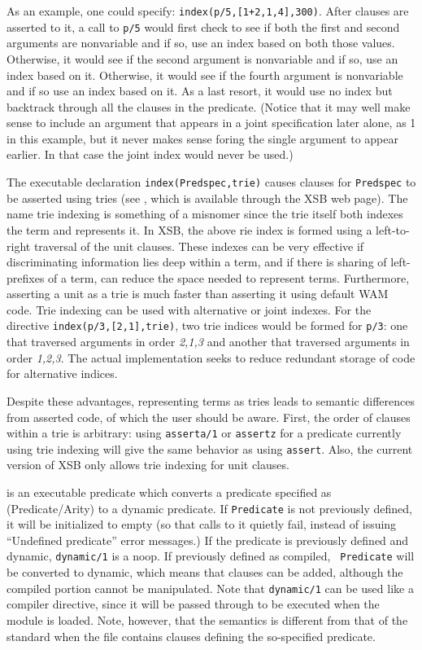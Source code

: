 \begin{description}
As an example, one could specify: {\tt index(p/5,[1+2,1,4],300)}.
After clauses are asserted to it, a call to {\tt p/5} would first
check to see if both the first and second arguments are nonvariable
and if so, use an index based on both those values. Otherwise, it
would see if the second argument is nonvariable and if so, use an
index based on it. Otherwise, it would see if the fourth argument is
nonvariable and if so use an index based on it. As a last resort, it would
use no index but backtrack through all the clauses in the predicate.
(Notice that it may well make sense to include an argument that 
appears in a joint specification later alone, as 1 in this example,
but it never makes sense foring the single argument to appear earlier. In
that case the joint index would never be used.)

The executable declaration {\tt index(Predspec,trie)} causes clauses
for {\tt Predspec} to be asserted using tries (see \cite{RRSSW98},
which is available through the XSB web page).  The name trie indexing
is something of a misnomer since the trie itself both indexes the term
and represents it.  In XSB, the above rie index is formed using a
left-to-right traversal of the unit clauses.  These indexes can be
very effective if discriminating information lies deep within a term,
and if there is sharing of left-prefixes of a term, can reduce the
space needed to represent terms.  Furthermore, asserting a unit as a
trie is much faster than asserting it using default WAM code.  Trie
indexing can be used with alternative or joint indexes.  For the
directive {\tt index(p/3,[2,1],trie)}, two trie indices would be
formed for {\tt p/3}: one that traversed arguments in order {\em
2,1,3} and another that traversed arguments in order {\em 1,2,3}.  The
actual implementation seeks to reduce redundant storage of code for
alternative indices.

Despite these advantages, representing terms as tries leads to
semantic differences from asserted code, of which the user should be
aware.  First, the order of clauses within a trie is arbitrary: using
{\tt asserta/1} or {\tt assertz} for a predicate currently using trie
indexing will give the same behavior as using {\tt assert}.  Also, the
current version of XSB only allows trie indexing for unit clauses.

\label{dynamic/1}
is an executable predicate which converts a predicate specified as
(Predicate/Arity) to a dynamic predicate. If {\tt Predicate} is not
previously defined, it will be initialized to empty (so that calls to
it quietly fail, instead of issuing {\sf ``Undefined predicate''}
error messages.) If the predicate is previously defined and dynamic,
{\tt dynamic/1} is a noop. If previously defined as compiled, {\tt
Predicate} will be converted to dynamic, which means that clauses can
be added, although the compiled portion cannot be manipulated.  Note
that {\tt dynamic/1} can be used like a compiler directive, since it
will be passed through to be executed when the module is loaded. Note,
however, that the semantics is different from that of the standard
\cite{ISO-Prolog} when the file contains clauses defining the
so-specified predicate.


\end{description}
